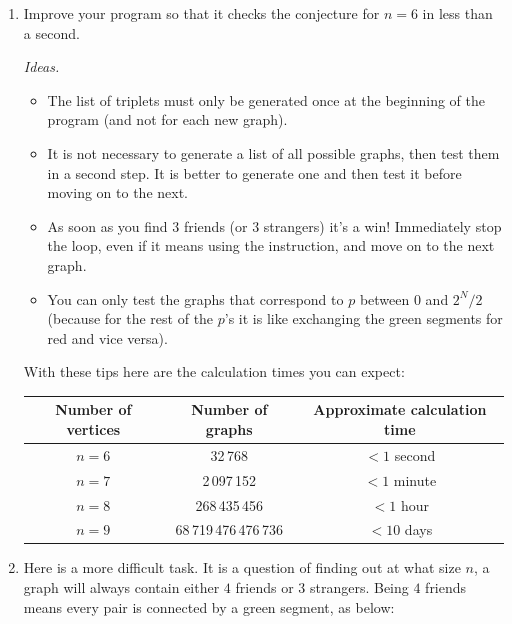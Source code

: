 \documentclass[11pt,class=report,crop=false]{standalone}
\begin{document}
\begin{activite}[To go further]


\begin{enumerate}
  \item Improve your program so that it checks the conjecture for $n=6$ in less than a second.
  
  
\emph{Ideas.}
  \begin{itemize}
    \item The list of triplets must only be generated once at the beginning of the program (and not for each new graph).
    \item It is not necessary to generate a list of all possible graphs, then test them in a second step. It is better to generate one and then test it before moving on to the next.
    \item As soon as you find $3$ friends (or $3$ strangers) it's a win! Immediately stop the loop, even if it means using the  instruction, and move on to the next graph.
    \item You can only test the graphs that correspond to $p$ between $0$ and $2^{N}/2$ (because for the rest of the $p$'s it is like exchanging the green segments for red and vice versa).
  \end{itemize}
  
\medskip
  
  With these tips here are the calculation times you can expect:
  \begin{center}
  \begin{tabular}{|c|c|c|}
  \hline
  Number of vertices & Number of graphs & Approximate calculation time \\
  \hline\hline
  $n=6$ & 32\,768 & $< 1$ second \\
  $n=7$ & 2\,097\,152 & $< 1$ minute \\  
  $n=8$ & 268\,435\,456 & $< 1$ hour \\
  $n=9$ & 68\,719\,476\,476\,736 & $< 10$ days \\ 
  \hline
  \end{tabular} 
  \end{center}




 
  \item Here is a more difficult task. It is a question of finding out at what size $n$, a graph will always contain either $4$ friends or $3$ strangers. 
  Being $4$ friends means every pair is connected by a green segment, as below:


\end{enumerate}
\end{activite}
\end{document}
